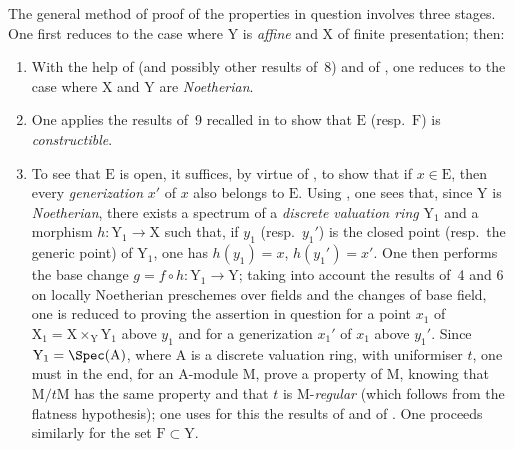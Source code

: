 \begin{env}[12.0.2]
\label{IV.12.0.2}
The general method of proof of the properties in question involves three stages.
One first reduces to the case where $\mathrm{Y}$ is \emph{affine} and $\mathrm{X}$ of finite presentation; then:

\medskip
\begin{enumerate}[label=\emph{\Alph*)}]
  \item With the help of  (and possibly other results of \textsection\,8) and of , one reduces to the case where $\mathrm{X}$ and $\mathrm{Y}$ are \emph{Noetherian}.

  \item One applies the results of \textsection\,9 recalled in  to show that $\mathrm{E}$ (resp.\ $\mathrm{F}$) is \emph{constructible}.

  \item To see that $\mathrm{E}$ is open, it suffices, by virtue of , to show that if $x\in\mathrm{E}$, then every \emph{generization} $x'$ of $x$ also belongs to $\mathrm{E}$.
Using , one sees that, since $\mathrm{Y}$ is \emph{Noetherian}, there exists a spectrum of a \emph{discrete valuation ring} $\mathrm{Y}_1$ and a morphism $h:\mathrm{Y}_1\to\mathrm{X}$ such that, if $y_1$ (resp.\ $y_1'$) is the closed point (resp.\ the generic point) of $\mathrm{Y}_1$, one has $h(y_1)=x$, $h(y_1')=x'$.
One then performs the base change $g=f\circ h:\mathrm{Y}_1\to\mathrm{Y}$; taking into account the results of \textsection\textsection\,4 and 6 on locally Noetherian preschemes over fields and the changes of base field, one is reduced to proving the assertion in question for a point $x_1$ of $\mathrm{X}_1=\mathrm{X}\times_{\mathrm{Y}}\mathrm{Y}_1$ above $y_1$ and for a generization $x_1'$ of $x_1$ above $y_1'$.
Since $\mathrm{Y}_1=\Spec(\mathrm{A})$, where $\mathrm{A}$ is a discrete valuation ring, with uniformiser $t$, one must in the end, for an $\mathrm{A}$-module $\mathrm{M}$, prove a property of $\mathrm{M}$, knowing that $\mathrm{M}/t\mathrm{M}$ has the same property and that $t$ is $\mathrm{M}$-\emph{regular} (which follows from the flatness hypothesis); one uses for this the results of  and of .
One proceeds similarly for the set $\mathrm{F}\subset\mathrm{Y}$.
\end{enumerate}
\end{env}


